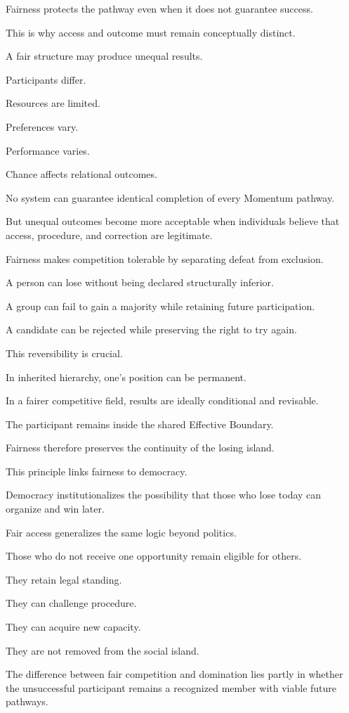 Fairness protects the pathway even when it does not guarantee success.

This is why access and outcome must remain conceptually distinct.

A fair structure may produce unequal results.

Participants differ.

Resources are limited.

Preferences vary.

Performance varies.

Chance affects relational outcomes.

No system can guarantee identical completion of every Momentum pathway.

But unequal outcomes become more acceptable when individuals believe that access, procedure, and correction are legitimate.

Fairness makes competition tolerable by separating defeat from exclusion.

A person can lose without being declared structurally inferior.

A group can fail to gain a majority while retaining future participation.

A candidate can be rejected while preserving the right to try again.

This reversibility is crucial.

In inherited hierarchy, one’s position can be permanent.

In a fairer competitive field, results are ideally conditional and revisable.

The participant remains inside the shared Effective Boundary.

Fairness therefore preserves the continuity of the losing island.

This principle links fairness to democracy.

Democracy institutionalizes the possibility that those who lose today can organize and win later.

Fair access generalizes the same logic beyond politics.

Those who do not receive one opportunity remain eligible for others.

They retain legal standing.

They can challenge procedure.

They can acquire new capacity.

They are not removed from the social island.

The difference between fair competition and domination lies partly in whether the unsuccessful participant remains a recognized member with viable future pathways.

